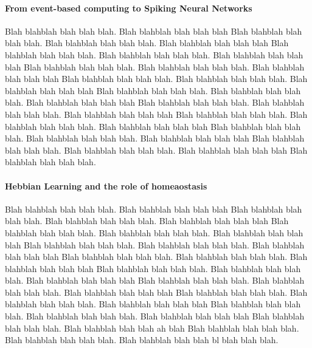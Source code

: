 \documentclass[12pt]{article}
\begin{document}
\paragraph*{From event-based computing to Spiking Neural Networks}
Blah blahblah blah blah blah. Blah blahblah blah blah blah Blah blahblah blah blah blah.
Blah blahblah blah blah blah. Blah blahblah blah blah blah Blah blahblah blah blah blah.
Blah blahblah blah blah blah. Blah blahblah blah blah blah Blah blahblah blah blah blah.
Blah blahblah blah blah blah. Blah blahblah blah blah blah Blah blahblah blah blah blah.
Blah blahblah blah blah blah. Blah blahblah blah blah blah Blah blahblah blah blah blah.
Blah blahblah blah blah blah. Blah blahblah blah blah blah Blah blahblah blah blah blah.
Blah blahblah blah blah blah. Blah blahblah blah blah blah Blah blahblah blah blah blah.
Blah blahblah blah blah blah. Blah blahblah blah blah blah Blah blahblah blah blah blah.
Blah blahblah blah blah blah. Blah blahblah blah blah blah Blah blahblah blah blah blah.
Blah blahblah blah blah blah. Blah blahblah blah blah blah Blah blahblah blah blah blah.





\paragraph*{Hebbian Learning and the role of homeaostasis}
Blah blahblah blah blah blah. Blah blahblah blah blah blah Blah blahblah blah blah blah.
Blah blahblah blah blah blah. Blah blahblah blah blah blah Blah blahblah blah blah blah.
Blah blahblah blah blah blah. Blah blahblah blah blah blah Blah blahblah blah blah blah.
Blah blahblah blah blah blah. Blah blahblah blah blah blah Blah blahblah blah blah blah.
Blah blahblah blah blah blah. Blah blahblah blah blah blah Blah blahblah blah blah blah.
Blah blahblah blah blah blah. Blah blahblah blah blah blah Blah blahblah blah blah blah.
Blah blahblah blah blah blah. Blah blahblah blah blah blah Blah blahblah blah blah blah.
Blah blahblah blah blah blah. Blah blahblah blah blah blah Blah blahblah blah blah blah.
Blah blahblah blah blah blah. Blah blahblah blah blah blah Blah blahblah blah blah blah.
Blah blahblah blah blah ah blah Blah blahblah blah blah blah.
Blah blahblah blah blah blah. Blah blahblah blah blah bl blah blah blah.
%
\end{document}
